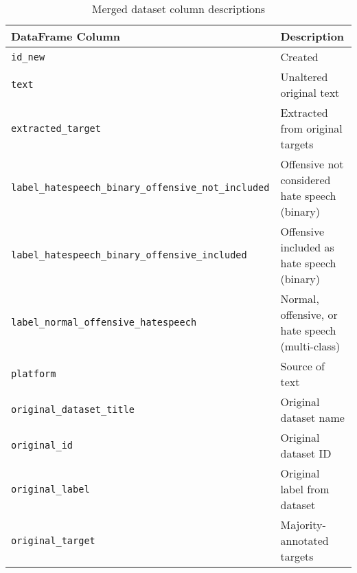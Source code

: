 \documentclass{article}
\begin{document}
\begin{table}[ht]
\centering
\begin{tabular}{ll}
\toprule
\textbf{DataFrame Column} & \textbf{Description} \\
\midrule
\texttt{id\_new} & Created \\
\texttt{text} & Unaltered original text \\
\texttt{extracted\_target} & Extracted from original targets \\
\texttt{label\_hatespeech\_binary\_offensive\_not\_included} & Offensive not considered hate speech (binary) \\
\texttt{label\_hatespeech\_binary\_offensive\_included} & Offensive included as hate speech (binary) \\
\texttt{label\_normal\_offensive\_hatespeech} & Normal, offensive, or hate speech (multi-class) \\
\texttt{platform} & Source of text \\
\texttt{original\_dataset\_title} & Original dataset name \\
\texttt{original\_id} & Original dataset ID \\
\texttt{original\_label} & Original label from dataset \\
\texttt{original\_target} & Majority-annotated targets \\
\bottomrule
\end{tabular}
\caption{Merged dataset column descriptions}
\label{tab:merged_columns}
\end{table}
\end{document}
